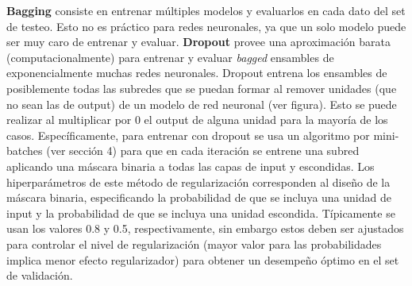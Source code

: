 \textbf{Bagging} consiste en entrenar m\'ultiples modelos y evaluarlos en cada dato del set de testeo. Esto no es pr\'actico para redes neuronales, ya que un solo modelo puede ser muy caro de entrenar y evaluar. \textbf{Dropout} provee una aproximaci\'on barata (computacionalmente) para entrenar y evaluar \textit{bagged} ensambles de exponencialmente muchas redes neuronales. Dropout entrena los ensambles de posiblemente todas las subredes que se puedan formar al remover unidades (que no sean las de output) de un modelo de red neuronal (ver figura). Esto se puede realizar al multiplicar por 0 el output de alguna unidad para la mayor\'ia de los casos. Espec\'ificamente, para entrenar con dropout se usa un algoritmo por mini-batches (ver secci\'on 4) para que en cada iteraci\'on se entrene una subred aplicando una m\'ascara binaria a todas las capas de input y escondidas. Los hiperpar\'ametros de este m\'etodo de regularizaci\'on corresponden al dise{\~{n}}o de la m\'ascara binaria, especificando la probabilidad de que se incluya una unidad de input y la probabilidad de que se incluya una unidad escondida. T\'ipicamente se usan los valores 0.8 y 0.5, respectivamente, sin embargo estos deben ser ajustados para controlar el nivel de regularizaci\'on (mayor valor para las probabilidades implica menor efecto regularizador) para obtener un desempe{\~{n}}o \'optimo en el set de validaci\'on.

